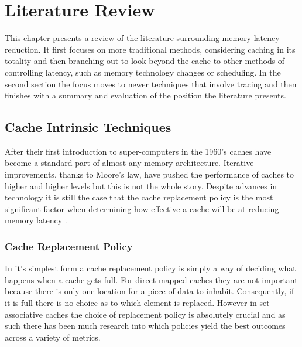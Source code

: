 
\chapter{Literature Review}

This chapter presents a review of the literature surrounding memory latency reduction. It first focuses on more traditional methods, considering caching in its totality and then branching out to look beyond the cache to other methods of controlling latency, such as memory technology changes or scheduling. In the second section the focus moves to newer techniques that involve tracing and then finishes with a summary and evaluation of the position the literature presents.

\section{Cache Intrinsic Techniques}

After their first introduction to super-computers in the 1960's \cite{pattersonComputerOrganizationDesign2018} caches have become a standard part of almost any memory architecture. Iterative improvements, thanks to Moore's law, have pushed the performance of caches to higher and higher levels but this is not the whole story. Despite advances in technology it is still the case that the cache replacement policy is the most significant factor when determining how effective a cache will be at reducing memory latency \cite{hennessyComputerArchitectureQuantitative2019}.

\subsection{Cache Replacement Policy}

In it's simplest form a cache replacement policy is simply a way of deciding what happens when a cache gets full. For direct-mapped caches they are not important because there is only one location for a piece of data to inhabit. Consequently, if it is full there is no choice as to which element is replaced. However in set-associative caches the choice of replacement policy is absolutely crucial \cite{hennessyComputerArchitectureQuantitative2019} and as such there has been much research into which policies yield the best outcomes across a variety of metrics.

